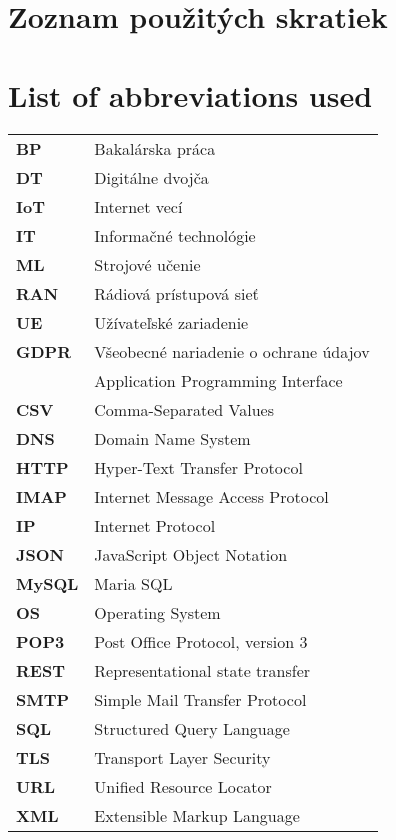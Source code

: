 \thispagestyle{plain}

\ifx\FIITlagEN\undefined
\section*{\Huge Zoznam použitých skratiek}
\else
\section*{\Huge List of abbreviations used}
\fi
\vskip 1cm

\begin{tabular}{ >{\bfseries}m{2cm} m{10cm} }
BP      & Bakalárska práca \\
DT      & Digitálne dvojča \\
IoT     & Internet vecí\\
IT      & Informačné technológie \\
ML      & Strojové učenie \\
RAN     & Rádiová prístupová sieť \\
UE      & Užívateľské zariadenie \\
GDPR    & Všeobecné nariadenie o ochrane údajov \\
\begin{comment}
API		& Application Programming Interface \\
CSV		& Comma-Separated Values \\
DNS		& Domain Name System \\
HTTP	& Hyper-Text Transfer Protocol \\
IMAP	& Internet Message Access Protocol \\
IP		& Internet Protocol \\
JSON	& JavaScript Object Notation \\
MySQL	& Maria SQL  \\
OS		& Operating System \\
POP3    & Post Office Protocol, version 3\\
REST    & Representational state transfer \\
SMTP	& Simple Mail Transfer Protocol \\
SQL		& Structured Query Language \\
TLS     & Transport Layer Security \\
URL		& Unified Resource Locator \\
XML		& Extensible Markup Language  
\end{comment}
\end{tabular}

\emptypage